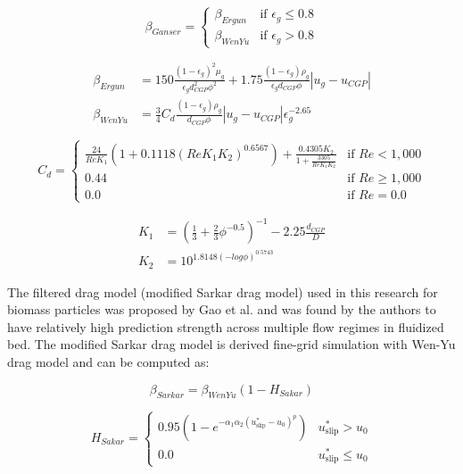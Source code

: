 \begin{equation}
    \beta_{Ganser} =
    \begin{cases}
        \beta_{Ergun} & \text{if } \epsilon_g \leq 0.8 \\
        \beta_{WenYu} & \text{if } \epsilon_g > 0.8
    \end{cases}
\end{equation}

\begin{align}
    \beta_{Ergun} &= 150 \frac{(1 - \epsilon_g)^2 \mu_g}{\epsilon_g d^2_{CGP} \phi^2} + 1.75 \frac{(1 - \epsilon_g) \rho_g}{\epsilon_g d_{CGP} \phi} |u_g - u_{CGP}| \\
    \beta_{WenYu} &= \frac{3}{4} C_d \frac{(1 - \epsilon_g) \rho_g}{d_{CGP} \phi} |u_g - u_{CGP}| \epsilon_g^{-2.65}
\end{align}

\begin{equation}
    C_d =
    \begin{cases}
        \frac{24}{Re K_1} (1 + 0.1118(Re K_1 K_2)^{0.6567}) + \frac{0.4305 K_2}{1 + \frac{3305}{Re K_1 K_2}} & \text{if } Re < 1,000 \\
        0.44 & \text{if } Re \geq 1,000 \\
        0.0 & \text{if } Re = 0.0
    \end{cases}
\end{equation}

\begin{align}
    K_1 &= \left(\frac{1}{3} + \frac{2}{3} \phi^{-0.5} \right)^{-1} - 2.25 \frac{d_{CGP}}{D} \\
    K_2 &= 10^{1.8148 (-log \phi)^{0.5743}}
\end{align}

The filtered drag model (modified Sarkar drag model) used in this research for biomass particles was proposed by Gao et al. \cite{Gao-2018} and was found by the authors to have relatively high prediction strength across multiple flow regimes in fluidized bed. The modified Sarkar drag model is derived fine-grid simulation with Wen-Yu drag model and can be computed as:

\begin{equation}
    \beta_{Sarkar} = \beta_{WenYu} (1 - H_{Sakar})
\end{equation}

\begin{equation}
    H_{Sakar} =
    \begin{cases}
        0.95 \left(1 - e^{-\alpha_1 \alpha_2 (u_{\text{slip}}^* - u_0)^p} \right) & u_{\text{slip}}^* > u_0 \\
        0.0 & u_{\text{slip}}^* \leq u_0
    \end{cases}
\end{equation}

